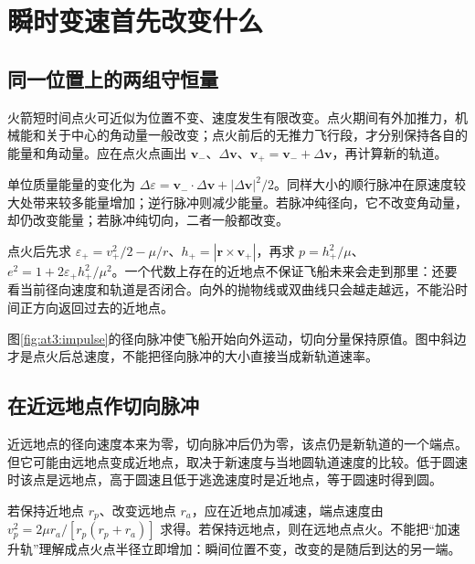 \section{瞬时变速首先改变什么}
\subsection{同一位置上的两组守恒量}

火箭短时间点火可近似为位置不变、速度发生有限改变。点火期间有外加推力，机械能和关于中心的角动量一般改变；点火前后的无推力飞行段，才分别保持各自的能量和角动量。应在点火点画出 $\bm v_-$、$\Delta\bm v$、$\bm v_+=\bm v_-+\Delta\bm v$，再计算新的轨道。

单位质量能量的变化为 $\Delta\varepsilon=\bm v_-\cdot\Delta\bm v+|\Delta\bm v|^2/2$。同样大小的顺行脉冲在原速度较大处带来较多能量增加；逆行脉冲则减少能量。若脉冲纯径向，它不改变角动量，却仍改变能量；若脉冲纯切向，二者一般都改变。

点火后先求 $\varepsilon_+=v_+^2/2-\mu/r$、$h_+=|\bm r\times\bm v_+|$，再求 $p=h_+^2/\mu$、$e^2=1+2\varepsilon_+h_+^2/\mu^2$。一个代数上存在的近地点不保证飞船未来会走到那里：还要看当前径向速度和轨道是否闭合。向外的抛物线或双曲线只会越走越远，不能沿时间正方向返回过去的近地点。

图\ref{fig:at3:impulse}的径向脉冲使飞船开始向外运动，切向分量保持原值。图中斜边才是点火后总速度，不能把径向脉冲的大小直接当成新轨道速率。\subsection{在近远地点作切向脉冲}

近远地点的径向速度本来为零，切向脉冲后仍为零，该点仍是新轨道的一个端点。但它可能由远地点变成近地点，取决于新速度与当地圆轨道速度的比较。低于圆速时该点是远地点，高于圆速且低于逃逸速度时是近地点，等于圆速时得到圆。

若保持近地点 $r_p$、改变远地点 $r_a$，应在近地点加减速，端点速度由 $v_p^2=2\mu r_a/[r_p(r_p+r_a)]$ 求得。若保持远地点，则在远地点点火。不能把“加速升轨”理解成点火点半径立即增加：瞬间位置不变，改变的是随后到达的另一端。


